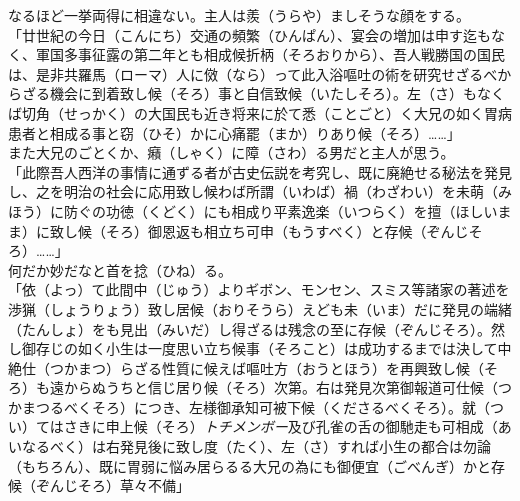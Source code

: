 \documentclass{book}
\begin{document}
なるほど一挙両得に相違ない。主人は羨（うらや）ましそうな顔をする。\\

「廿世紀の今日（こんにち）交通の頻繁（ひんぱん）、宴会の増加は申す迄もなく、軍国多事征露の第二年とも相成候折柄（そろおりから）、吾人戦勝国の国民は、是非共羅馬（ローマ）人に傚（なら）って此入浴嘔吐の術を研究せざるべからざる機会に到着致し候（そろ）事と自信致候（いたしそろ）。左（さ）もなくば切角（せっかく）の大国民も近き将来に於て悉（ことごと）く大兄の如く胃病患者と相成る事と窃（ひそ）かに心痛罷（まか）りあり候（そろ）\ldots{}\ldots{}」\\

また大兄のごとくか、癪（しゃく）に障（さわ）る男だと主人が思う。\\

「此際吾人西洋の事情に通ずる者が古史伝説を考究し、既に廃絶せる秘法を発見し、之を明治の社会に応用致し候わば所謂（いわば）禍（わざわい）を未萌（みほう）に防ぐの功徳（くどく）にも相成り平素逸楽（いつらく）を擅（ほしいまま）に致し候（そろ）御恩返も相立ち可申（もうすべく）と存候（ぞんじそろ）\ldots{}\ldots{}」\\

何だか妙だなと首を捻（ひね）る。\\

「依（よっ）て此間中（じゅう）よりギボン、モンセン、スミス等諸家の著述を渉猟（しょうりょう）致し居候（おりそうら）えども未（いま）だに発見の端緒（たんしょ）をも見出（みいだ）し得ざるは残念の至に存候（ぞんじそろ）。然し御存じの如く小生は一度思い立ち候事（そろこと）は成功するまでは決して中絶仕（つかまつ）らざる性質に候えば嘔吐方（おうとほう）を再興致し候（そろ）も遠からぬうちと信じ居り候（そろ）次第。右は発見次第御報道可仕候（つかまつるべくそろ）につき、左様御承知可被下候（くださるべくそろ）。就（つい）てはさきに申上候（そろ）\emph{トチメンボー}及び孔雀の舌の御馳走も可相成（あいなるべく）は右発見後に致し度（たく）、左（さ）すれば小生の都合は勿論（もちろん）、既に胃弱に悩み居らるる大兄の為にも御便宜（ごべんぎ）かと存候（ぞんじそろ）草々不備」\\
\end{document}
